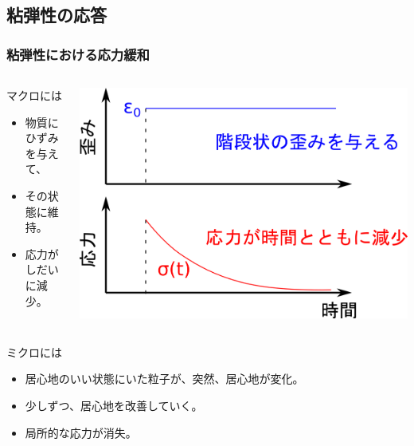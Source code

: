 \documentclass[12pt, dvipdfmx]{beamer}
\begin{document}
\subsection{粘弾性の応答}
\begin{frame}
	\frametitle{粘弾性における応力緩和}
		\begin{columns}[T, onlytextwidth]
				\begin{block}{マクロには}
					\begin{itemize}
						\item 物質にひずみを与えて、
						\item その状態に維持。
						\item 応力がしだいに減少。
					\end{itemize}
				\end{block}
			\includegraphics[width=\textwidth]{stress_relux.png}
		\end{columns}
		
		\begin{exampleblock}{ミクロには}
			\begin{itemize}
				\item 居心地のいい状態にいた粒子が、突然、居心地が変化。
				\item 少しずつ、\alert{居心地を改善}していく。
				\item 局所的な応力が消失。
			\end{itemize}
		\end{exampleblock}
\end{frame}
\end{document}
